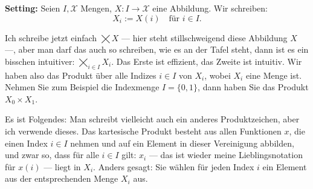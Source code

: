 \begin{math-stroke}
\textbf{Setting:} Seien $I, \mathcal{X}$ Mengen, $X \colon I \to \mathcal{X}$ eine Abbildung. Wir schreiben:
\[
X_i := X(i) \quad \text{für } i \in I.
\]

\end{math-stroke}

\begin{spoken-clean}[00:20:25 - 00:22:27]
Ich schreibe jetzt einfach $\bigtimes X$ --- hier steht stillschweigend diese Abbildung $X$ ---, aber man darf das auch so schreiben, wie es an der Tafel steht, dann ist es ein bisschen intuitiver: $\bigtimes_{i \in I} X_i$. Das Erste ist effizient, das Zweite ist intuitiv. Wir haben also das Produkt über alle Indizes $i \in I$ von $X_i$, wobei $X_i$ eine Menge ist. Nehmen Sie zum Beispiel die Indexmenge $I = \{0, 1\}$, dann haben Sie das Produkt $X_0 \times X_1$.

Es ist Folgendes: Man schreibt vielleicht auch ein anderes Produktzeichen, aber ich verwende dieses. Das kartesische Produkt besteht aus allen Funktionen $x$, die einen Index $i \in I$ nehmen und auf ein Element in dieser Vereinigung abbilden, und zwar so, dass für alle $i \in I$ gilt: $x_i$ --- das ist wieder meine Lieblingsnotation für $x(i)$ --- liegt in $X_i$. Anders gesagt: Sie wählen für jeden Index $i$ ein Element aus der entsprechenden Menge $X_i$ aus.
\end{spoken-clean}

